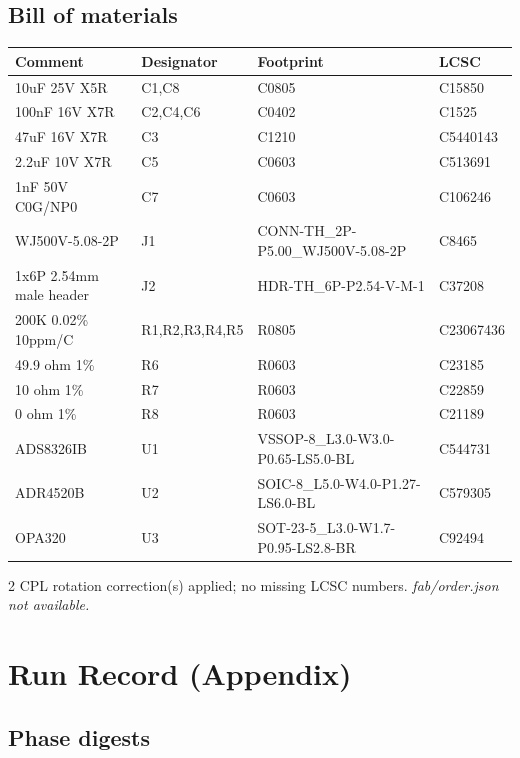 \documentclass[11pt,a4paper]{article}
\begin{document}
\subsection*{Bill of materials}
{\small
\begin{longtable}{p{4.4cm}p{2.8cm}p{4.6cm}l}
\toprule
\textbf{Comment} & \textbf{Designator} & \textbf{Footprint} & \textbf{LCSC} \\
\midrule
\endhead
10uF 25V X5R & C1,C8 & C0805 & C15850 \\
100nF 16V X7R & C2,C4,C6 & C0402 & C1525 \\
47uF 16V X7R & C3 & C1210 & C5440143 \\
2.2uF 10V X7R & C5 & C0603 & C513691 \\
1nF 50V C0G/NP0 & C7 & C0603 & C106246 \\
WJ500V-5.08-2P & J1 & CONN-TH\_2P-P5.00\_WJ500V-5.08-2P & C8465 \\
1x6P 2.54mm male header & J2 & HDR-TH\_6P-P2.54-V-M-1 & C37208 \\
200K 0.02\% 10ppm/C & R1,R2,R3,R4,R5 & R0805 & C23067436 \\
49.9 ohm 1\% & R6 & R0603 & C23185 \\
10 ohm 1\% & R7 & R0603 & C22859 \\
0 ohm 1\% & R8 & R0603 & C21189 \\
ADS8326IB & U1 & VSSOP-8\_L3.0-W3.0-P0.65-LS5.0-BL & C544731 \\
ADR4520B & U2 & SOIC-8\_L5.0-W4.0-P1.27-LS6.0-BL & C579305 \\
OPA320 & U3 & SOT-23-5\_L3.0-W1.7-P0.95-LS2.8-BR & C92494 \\
\bottomrule
\end{longtable}
}
2 CPL rotation correction(s) applied; no missing LCSC numbers.
\emph{fab/order.json not available.}
\section{Run Record (Appendix)}
\subsection*{Phase digests}
\end{document}
